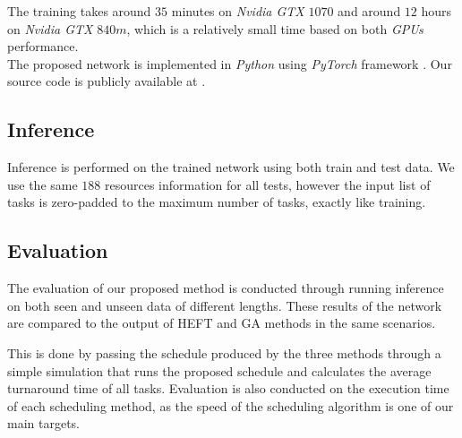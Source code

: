 The training takes around $35$ minutes on \emph{Nvidia GTX} $1070$ and around $12$ hours on \emph{Nvidia GTX} $840m$, which is a relatively small time based on both \emph{GPUs} performance. \\

The proposed network is implemented in \emph{Python} using \emph{PyTorch} framework \cite{paszke2019pytorch}.  Our source code is publicly available at .

\subsection{Inference}
Inference is performed on the trained network using both train and test data. We use the same $188$ resources information for all tests, however the input list of tasks is zero-padded to the maximum number of tasks, exactly like training.

\subsection{Evaluation}
The evaluation of our proposed method is conducted through running inference on both seen and unseen data of different lengths. These results of the network are compared to the output of HEFT and GA methods in the same scenarios. 

This is done by passing the schedule produced by the three methods through a simple simulation that runs the proposed schedule and calculates the average turnaround time of all tasks. Evaluation is also conducted on the execution time of each scheduling method, as the speed of the scheduling algorithm is one of our main targets.

